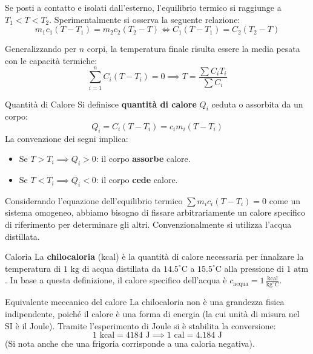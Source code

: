 Se posti a contatto e isolati dall'esterno, l'equilibrio termico si raggiunge a $T_1 < T < T_2$.
Sperimentalmente si osserva la seguente relazione:
\begin{equation}
m_1 c_1 (T - T_1) = m_2 c_2 (T_2 - T) \iff C_1 (T - T_1) = C_2 (T_2 - T)
\end{equation}

Generalizzando per $n$ corpi, la temperatura finale risulta essere la media pesata con le capacità termiche:
\begin{equation}
\sum_{i=1}^n C_i (T - T_i) = 0 \implies T = \frac{\sum C_i T_i}{\sum C_i}
\end{equation}

\begin{definizione}{Quantità di Calore}
Si definisce \textbf{quantità di calore} $Q_i$ ceduta o assorbita da un corpo:
\begin{equation}
Q_i = C_i (T - T_i) = c_i m_i (T - T_i)
\end{equation}
La convenzione dei segni implica:
\begin{itemize}
    \item Se $T > T_i \implies Q_i > 0$: il corpo \textbf{assorbe} calore.
    \item Se $T < T_i \implies Q_i < 0$: il corpo \textbf{cede} calore.
\end{itemize}
\end{definizione}

\medskip
Considerando l'equazione dell'equilibrio termico $\sum m_i c_i (T - T_i) = 0$ come un sistema omogeneo, abbiamo bisogno di fissare arbitrariamente un calore specifico di riferimento per determinare gli altri. Convenzionalmente si utilizza l'acqua distillata.

\begin{definizione}{Caloria}
La \textbf{chilocaloria} (kcal) è la quantità di calore necessaria per innalzare la temperatura di $1\text{ kg}$ di acqua distillata da $14.5^\circ\text{C}$ a $15.5^\circ\text{C}$ alla pressione di $1\text{ atm}$.
In base a questa definizione, il calore specifico dell'acqua è $c_{\text{acqua}} = 1 \, \frac{\text{kcal}}{\text{kg}^\circ\text{C}}$.
\end{definizione}

\begin{osservazione}{Equivalente meccanico del calore}
La chilocaloria non è una grandezza fisica indipendente, poiché il calore è una forma di energia (la cui unità di misura nel SI è il Joule). Tramite l'esperimento di Joule si è stabilita la conversione:
\begin{equation}
1\text{ kcal} = 4184\text{ J} \implies 1\text{ cal} = 4.184\text{ J}
\end{equation}
(Si nota anche che una frigoria corrisponde a una caloria negativa).
\end{osservazione}


